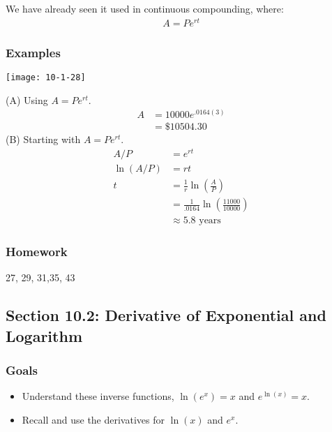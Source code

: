 \documentclass[14pt]{extarticle}
\begin{document}
\cleardoublepage
We have already seen it used in continuous compounding, where:
\begin{align*}
	A = Pe^{rt}
\end{align*}

\subsubsection*{Examples}
\begin{center}
	\texttt{[image: 10-1-28]}
\end{center}
(A) Using $A = Pe^{rt}$.
\begin{align*}
	A &= 10000e^{.0164(3)} \\
	&=\$10504.30
\end{align*}
(B) Starting with $A = Pe^{rt}$.
\begin{align*}
	A/P &= e^{rt} \\
	\ln(A/P)&=rt \\
	t &= \frac{1}{r} \ln(\frac{A}{P}) \\
	&= \frac{1}{.0164} \ln(\frac{11000}{10000}) \\
	&\approx 5.8 \text{ years}
\end{align*}

\subsubsection*{Homework}
27, 29, 31,35, 43


\cleardoublepage
\subsection{Section 10.2: Derivative of Exponential and Logarithm}
\subsubsection*{Goals}
\begin{itemize}
	\item Understand these inverse functions, $\ln(e^x) = x$ and $e^{\ln(x)} = x$.
	\item Recall and use the derivatives for $\ln(x)$ and $e^x$.
\end{itemize}
\end{document}
